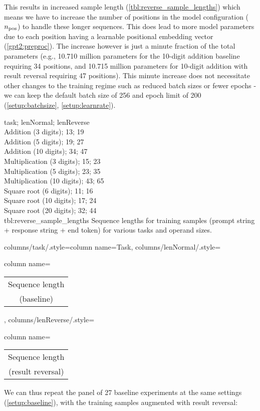 This results in increased sample length (\cref{tbl:reverse_sample_lengths}) which means we have to increase the number of positions in the model configuration (${n_\textrm{pos}}$) to handle these longer sequences. This does lead to more model parameters due to each position having a learnable positional embedding vector (\cref{gpt2:preproc}). The increase however is just a minute fraction of the total parameters (e.g., 10.710 million parameters for the 10-digit addition baseline requiring 34 positions, and 10.715 million parameters for 10-digit addition with result reversal requiring 47 positions). This minute increase does not necessitate other changes to the training regime such as reduced batch sizes or fewer epochs - we can keep the default batch size of 256 and epoch limit of 200 (\cref{setup:batchsize}, \cref{setup:learnrate}).


{
	task; lenNormal; lenReverse\\
	Addition (3 digits); 13; 19 \\
	Addition (5 digits); 19; 27 \\
	Addition (10 digits); 34; 47 \\
	Multiplication (3 digits); 15; 23 \\
	Multiplication (5 digits); 23; 35 \\
	Multiplication (10 digits); 43; 65 \\
	Square root (6 digits); 11; 16 \\
	Square root (10 digits); 17; 24 \\
	Square root (20 digits); 32; 44 \\
}
{tbl:reverse_sample_lengths}
{
	Sequence lengths for training samples (prompt string + response string + end token) for various tasks and operand sizes.
}
{%
	columns/task/.style={column name={Task}},
	columns/lenNormal/.style={column name={\begin{tabular}{c} Sequence length \\ (baseline) \\ \end{tabular}}},
	columns/lenReverse/.style={column name={\begin{tabular}{c} Sequence length \\ (result reversal) \\ \end{tabular}}}
}



We can thus repeat the panel of 27 baseline experiments at the same settings (\cref{setup:baseline}), with the training samples augmented with result reversal:


